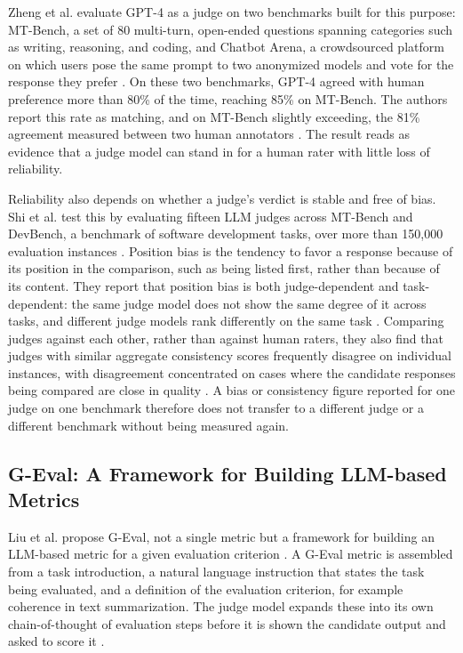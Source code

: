 Zheng et al. evaluate GPT-4 as a judge on two benchmarks built for this purpose: MT-Bench, a set of 80 multi-turn, open-ended questions spanning categories such as writing, reasoning, and coding, and Chatbot Arena, a crowdsourced platform on which users pose the same prompt to two anonymized models and vote for the response they prefer \cite{zhengJudgingLLMasaJudgeMTBench2023}. On these two benchmarks, GPT-4 agreed with human preference more than 80\% of the time, reaching 85\% on MT-Bench. The authors report this rate as matching, and on MT-Bench slightly exceeding, the 81\% agreement measured between two human annotators \cite{zhengJudgingLLMasaJudgeMTBench2023}. The result reads as evidence that a judge model can stand in for a human rater with little loss of reliability.

Reliability also depends on whether a judge's verdict is stable and free of bias. Shi et al. test this by evaluating fifteen LLM judges across MT-Bench and DevBench, a benchmark of software development tasks, over more than 150,000 evaluation instances \cite{shiJudgingJudgesSystematic2025}. Position bias is the tendency to favor a response because of its position in the comparison, such as being listed first, rather than because of its content. They report that position bias is both judge-dependent and task-dependent: the same judge model does not show the same degree of it across tasks, and different judge models rank differently on the same task \cite{shiJudgingJudgesSystematic2025}. Comparing judges against each other, rather than against human raters, they also find that judges with similar aggregate consistency scores frequently disagree on individual instances, with disagreement concentrated on cases where the candidate responses being compared are close in quality \cite{shiJudgingJudgesSystematic2025}. A bias or consistency figure reported for one judge on one benchmark therefore does not transfer to a different judge or a different benchmark without being measured again.

\subsection{G-Eval: A Framework for Building LLM-based Metrics}
\label{sec:llm-as-judge-geval}

Liu et al. propose G-Eval, not a single metric but a framework for building an LLM-based metric for a given evaluation criterion \cite{liuGEvalNLGEvaluation2023}. A G-Eval metric is assembled from a task introduction, a natural language instruction that states the task being evaluated, and a definition of the evaluation criterion, for example coherence in text summarization. The judge model expands these into its own chain-of-thought of evaluation steps before it is shown the candidate output and asked to score it \cite{liuGEvalNLGEvaluation2023}.

